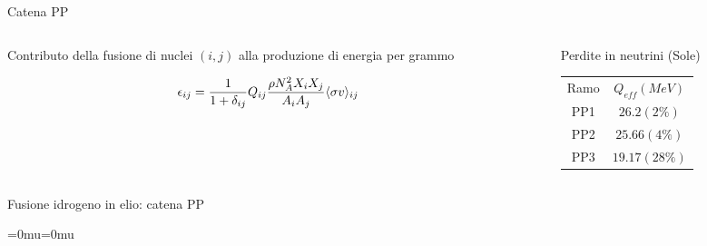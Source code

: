 \documentclass[10pt,xcolor={usenames},fleqn,mathserif,serif]{beamer}
\newcommand{\setmuskip}[2]{#1=#2\relax} %
\begin{document}
\begin{frame}{Catena PP}

\begin{columns}

\begin{column}{0.7\textwidth}

\begin{block}{Contributo della fusione di nuclei $(i,j)$ alla produzione di energia per grammo}

\begin{align*}
&\epsilon_{ij}=\frac{1}{1+\delta_{ij}}Q_{ij}\frac{\rho N_A^2X_iX_j}{{A_iA_j}}\exv{\sigma v}_{ij}%
\end{align*}
\end{block}

\end{column}

\begin{column}{0.4\textwidth}

\begin{block}{Perdite in neutrini (Sole)}
\begin{tabular}{cc}
Ramo&$Q_{eff} (MeV)$\\
PP1&$26.2 (2\%)$\\
PP2&$25.66  (4\%)$\\
PP3 &$19.17 (28\%)$\\
\end{tabular}

\end{block}

\end{column}

\end{columns}


\begin{columns}

\begin{column}{0.65\textwidth}

\begin{block}{Fusione idrogeno in elio: catena PP}

\setmuskip{\thinmuskip}{0mu}\setmuskip{\medmuskip}{0mu}

\centering
\begin{tikzpicture}


\end{tikzpicture}
\end{block}
\end{column}
\end{columns}
\end{frame}
\end{document}
